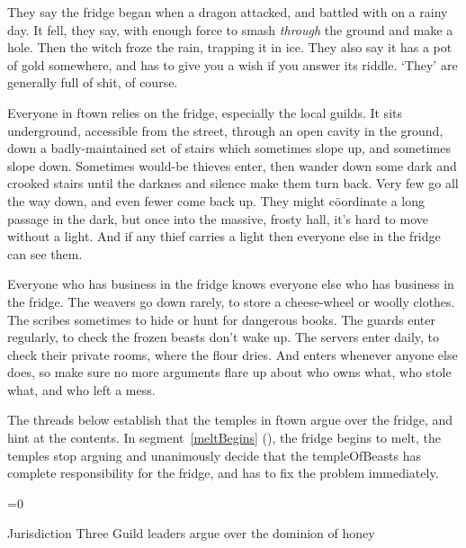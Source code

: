 
\begin{speechtext}
  \noindent
  They say the fridge began when a dragon attacked, and battled with  on a rainy day.
  It fell, they say, with enough force to smash \emph{through} the ground and make a hole.
  Then the \gls{witch} froze the rain, trapping it in ice.
  They also say it has a pot of gold somewhere, and has to give you a wish if you answer its riddle.
  `They' are generally full of shit, of course.
\end{speechtext}

\begin{exampletext}
  Everyone in \gls{ftown} relies on the fridge, especially the local guilds.
  It sits underground, accessible from the street, through an open cavity in the ground, down a badly-maintained set of stairs which sometimes slope up, and sometimes slope down.
  Sometimes would-be thieves enter, then wander down some dark and crooked stairs until the darknes and silence make them turn back.
  Very few go all the way down, and even fewer come back up.
  They might c\"oordinate a long passage in the dark, but once into the massive, frosty hall, it's hard to move without a light.
  And if any thief carries a light then everyone else in the fridge can see them.

  Everyone who has business in the fridge knows everyone else who has business in the fridge.
  The \glspl{weaver} go down rarely, to store a cheese-wheel or woolly clothes.
  The \glspl{scribe} sometimes to hide or hunt for dangerous books.
  The \glspl{guard} enter regularly, to check the frozen beasts don't wake up.
  The \glspl{server} enter daily, to check their private rooms, where the flour dries.
  And  enters whenever anyone else does, so make sure no more arguments flare up about who owns what, who stole what, and who left a mess.
\end{exampletext}

The \glspl{thread} below establish that the \glspl{temple} in \gls{ftown} argue over the fridge, and hint at the contents.
In \gls{segment}~\ref{meltBegins} (), the fridge begins to melt, the \glspl{temple} stop arguing and unanimously decide that the \gls{templeOfBeasts} has complete responsibility for the fridge, and has to fix the problem immediately.

\ifnum\value{temperature}=0
  \hibernationSegment
\fi

{Jurisdiction}%
{Three Guild leaders argue over the dominion of honey}%

